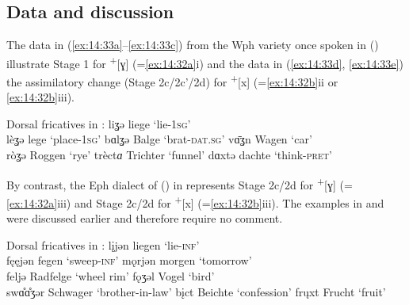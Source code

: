 \subsection{Data and discussion}\label{sec:14.4.2}

The data in (\ref{ex:14:33a}--\ref{ex:14:33c}) from the Wph variety once spoken in  () illustrate Stage 1 for  \textsuperscript{+}[ɣ] (=\ref{ex:14:32a}i) and the data in (\ref{ex:14:33d}, \ref{ex:14:33e}) the assimilatory change (Stage 2c/2c{}'/2d) for  \textsuperscript{+}[x] (=\ref{ex:14:32b}ii or \ref{ex:14:32b}iii).


\ea%
\label{ex:14:33}Dorsal fricatives in :
\ea\label{ex:14:33a} liʓə \tab [lɪɣə] \tab liege \tab ‘lie\textsc{{}-1sg}’ \\
    lèʓə \tab [lɛɣə] \tab lege \tab ‘place-\textsc{1sg}’ 
\ex\label{ex:14:33b} bɑlʓə \tab [bɑlɣə] \tab  Balge \tab ‘brat-\textsc{dat}.\textsc{sg}’ 
\ex\label{ex:14:33c} vɑ̄ʓn \tab [vɑːɣn̩] \tab Wagen \tab ‘car’ \\
    ròʓə \tab [ʀɔɣə] \tab Roggen \tab ‘rye’ 
\ex\label{ex:14:33d} trèct\textit{ɑ} \tab [tʀɛçtɐ] \tab Trichter \tab ‘funnel’ 
\ex\label{ex:14:33e} dɑxtə \tab [dɑxtə] \tab dachte \tab ‘think\textsc{{}-pret}’ 
\z 
\z 

By contrast, the Eph dialect of  () in  represents Stage 2c/2d for  \textsuperscript{+}[ɣ] (=\ref{ex:14:32a}iii) and Stage 2c/2d for  \textsuperscript{+}[x] (=\ref{ex:14:32b}iii). The examples in  and  were discussed earlier and therefore require no comment.

\ea%
\label{ex:14:34}Dorsal fricatives in :
\ea\label{ex:14:34a} l\k{i}jən \tab [lɪʝən] \tab liegen \tab ‘lie\textsc{{}-inf}’ \\
    fęęjən \tab [fɛːʝən] \tab  fegen \tab ‘sweep\textsc{{}-inf}’ 
\ex\label{ex:14:34b} mǫrjən \tab  [mɔrʝən] \tab morgen \tab ‘tomorrow’ \\
    feljə \tab  [felʝə] \tab Radfelge \tab ‘wheel rim’ 
\ex\label{ex:14:34c} fǫʒəl \tab [fɔɣəl] \tab Vogel \tab ‘bird’ \\
    swɑ̊ɑ̊ʒər \tab [swɑːɣər] \tab Schwager \tab ‘brother-in-law’ 
\ex\label{ex:14:34d} b\k{i}ct \tab [bɪçt] \tab Beichte \tab ‘confession’ 
\ex\label{ex:14:34e} fr\k{u}xt \tab [frʊxt] \tab Frucht \tab ‘fruit’ 
\z 
\z 


